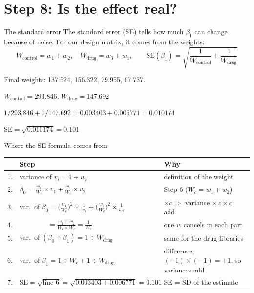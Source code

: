 \documentclass[aspectratio=169,11pt]{beamer}
\begin{document}
\section{Step 8: Is the effect real?}

\begin{frame}{The standard error}
The \alert{standard error} (SE) tells how much $\beta_1$ can change because
of noise. For our design matrix, it comes from the weights:
\[
W_{\text{control}} = w_1 + w_2, \quad W_{\text{drug}} = w_3 + w_4, \qquad
\text{SE}(\beta_1) = \sqrt{\frac{1}{W_{\text{control}}} + \frac{1}{W_{\text{drug}}}}
\]
\begin{worked}[ 13]
\small
Final weights: 137.524, 156.322, 79.955, 67.737.

$W_{\text{control}} = 293.846$, \quad $W_{\text{drug}} = 147.692$

$1/293.846 + 1/147.692 = 0.003403 + 0.006771 = 0.010174$

$\text{SE} = \sqrt{0.010174} = 0.101$
\end{worked}
\end{frame}

\begin{frame}{Where the SE formula comes from}
\footnotesize
\renewcommand{\arraystretch}{1.3}\setlength{\tabcolsep}{4pt}
\begin{tabular}{@{}r@{\;}l l@{}}
\toprule
& Step & Why\\
\midrule
1. & variance of $v_i = 1 \div w_i$ & definition of the weight\\
2. & $\beta_0 = \frac{w_1}{W_c} \times v_1 + \frac{w_2}{W_c} \times v_2$ & Step 6 ($W_c = w_1 + w_2$)\\
3. & var.\ of $\beta_0 = \bigl(\frac{w_1}{W_c}\bigr)^2 \times \frac{1}{w_1} + \bigl(\frac{w_2}{W_c}\bigr)^2 \times \frac{1}{w_2}$ & $\times c \Rightarrow$ variance $\times\, c \times c$; add\\
4. & $\phantom{\text{var.\ of }\beta_0} = \frac{w_1 + w_2}{W_c \times W_c} = \frac{1}{W_c}$ & one $w$ cancels in each part\\
5. & var.\ of $(\beta_0 + \beta_1) = 1 \div W_{\text{drug}}$ & same for the drug libraries\\
6. & var.\ of $\beta_1 = 1 \div W_c + 1 \div W_{\text{drug}}$ & difference; $(-1) \times (-1) = +1$, so variances add\\
7. & $\text{SE} = \sqrt{\text{line 6}} = \sqrt{0.003403 + 0.006771} = 0.101$ & SE = SD of the estimate\\
\bottomrule
\end{tabular}
\end{frame}
\end{document}

